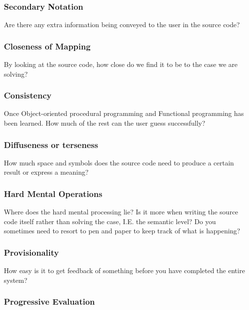 \documentclass[12pt]{article}
\theoremstyle{definition}
\theoremstyle{theorem}
\begin{document}
\subsubsection{Secondary Notation}

Are there any extra information being conveyed to the user in the source code?

\subsubsection{Closeness of Mapping}

By looking at the source code, how close do we find it to be to the case
we are solving?

\subsubsection{Consistency}

Once Object-oriented procedural programming and Functional programming has been
learned. How much of the rest can the user guess successfully? 

\subsubsection{Diffuseness or terseness}

How much space and symbols does the source code need to produce a certain result
or express a meaning?

\subsubsection{Hard Mental Operations}

Where does the hard mental processing lie? Is it more when writing the source
code itself rather than solving the case, I.E. the semantic level? Do you
sometimes need to resort to pen and paper to keep track of what is happening?

\subsubsection{Provisionality}

How easy is it to get feedback of something before you have completed the entire
system?

\subsubsection{Progressive Evaluation}
\end{document}
